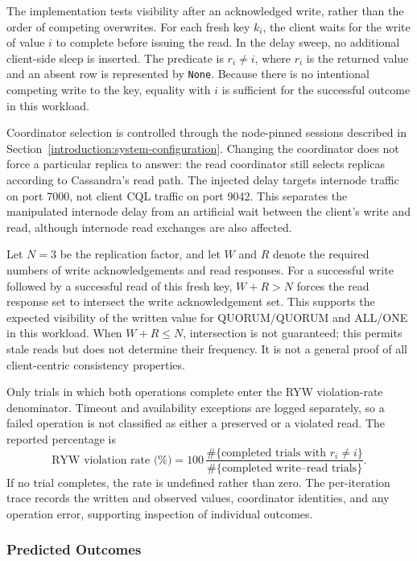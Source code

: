 The implementation tests visibility after an acknowledged write, rather than the order of competing overwrites. For each fresh key $k_i$, the client waits for the write of value $i$ to complete before issuing the read. In the delay sweep, no additional client-side sleep is inserted. The predicate is $r_i\ne i$, where $r_i$ is the returned value and an absent row is represented by \texttt{None}. Because there is no intentional competing write to the key, equality with $i$ is sufficient for the successful outcome in this workload.

Coordinator selection is controlled through the node-pinned sessions described in Section~\ref{introduction:system-configuration}. Changing the coordinator does not force a particular replica to answer: the read coordinator still selects replicas according to Cassandra's read path. The injected delay targets internode traffic on port 7000, not client CQL traffic on port 9042. This separates the manipulated internode delay from an artificial wait between the client's write and read, although internode read exchanges are also affected.

Let $N=3$ be the replication factor, and let $W$ and $R$ denote the required numbers of write acknowledgements and read responses. For a successful write followed by a successful read of this fresh key, $W+R>N$ forces the read response set to intersect the write acknowledgement set. This supports the expected visibility of the written value for QUORUM/QUORUM and ALL/ONE in this workload. When $W+R\leq N$, intersection is not guaranteed; this permits stale reads but does not determine their frequency. It is not a general proof of all client-centric consistency properties.

Only trials in which both operations complete enter the RYW violation-rate denominator. Timeout and availability exceptions are logged separately, so a failed operation is not classified as either a preserved or a violated read. The reported percentage is
\begin{equation}
\text{RYW violation rate (\%)} =
100\,\frac{\#\{\text{completed trials with }r_i\ne i\}}
{\#\{\text{completed write--read trials}\}}.
\end{equation}
If no trial completes, the rate is undefined rather than zero. The per-iteration trace records the written and observed values, coordinator identities, and any operation error, supporting inspection of individual outcomes.

\subsubsection{Predicted Outcomes}\label{ryw:predicted-outcomes}

